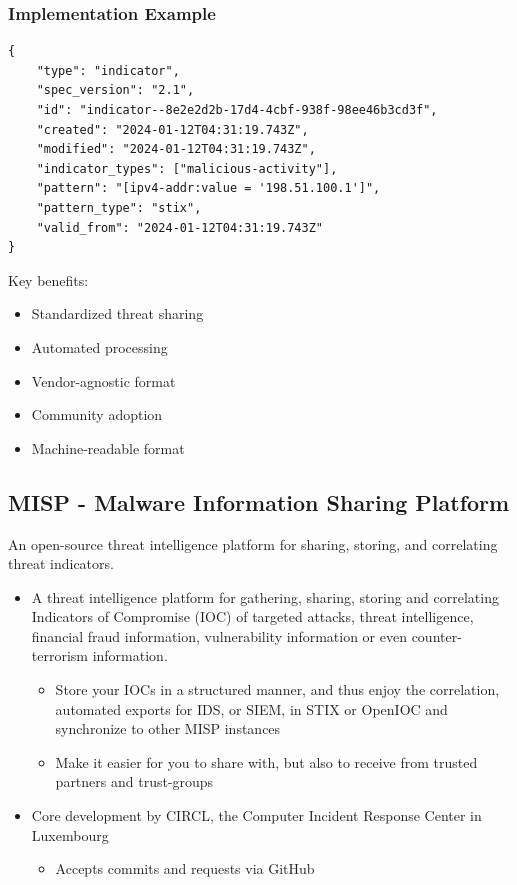 \subsubsection{Implementation Example}
\begin{verbatim}
{
    "type": "indicator",
    "spec_version": "2.1",
    "id": "indicator--8e2e2d2b-17d4-4cbf-938f-98ee46b3cd3f",
    "created": "2024-01-12T04:31:19.743Z",
    "modified": "2024-01-12T04:31:19.743Z",
    "indicator_types": ["malicious-activity"],
    "pattern": "[ipv4-addr:value = '198.51.100.1']",
    "pattern_type": "stix",
    "valid_from": "2024-01-12T04:31:19.743Z"
}
\end{verbatim}

Key benefits:
\begin{itemize}
  \item Standardized threat sharing
  \item Automated processing
  \item Vendor-agnostic format
  \item Community adoption
  \item Machine-readable format
\end{itemize}

\subsection{}
\subsection{MISP - Malware Information Sharing Platform}
An open-source threat intelligence platform for sharing, storing, and correlating threat indicators.

\begin{itemize}
  \item A threat intelligence platform for gathering, sharing, storing and correlating Indicators of Compromise (IOC) of targeted attacks, threat intelligence, financial fraud information, vulnerability information or even counter-terrorism information.
  \begin{itemize}
    \item Store your IOCs in a structured manner, and thus enjoy the correlation, automated exports for IDS, or SIEM, in STIX or OpenIOC and synchronize to other MISP instances
    \item Make it easier for you to share with, but also to receive from trusted partners and trust-groups
  \end{itemize}
  \item Core development by CIRCL, the Computer Incident Response Center in Luxembourg
  \begin{itemize}
    \item Accepts commits and requests via GitHub
  \end{itemize}
\end{itemize}

